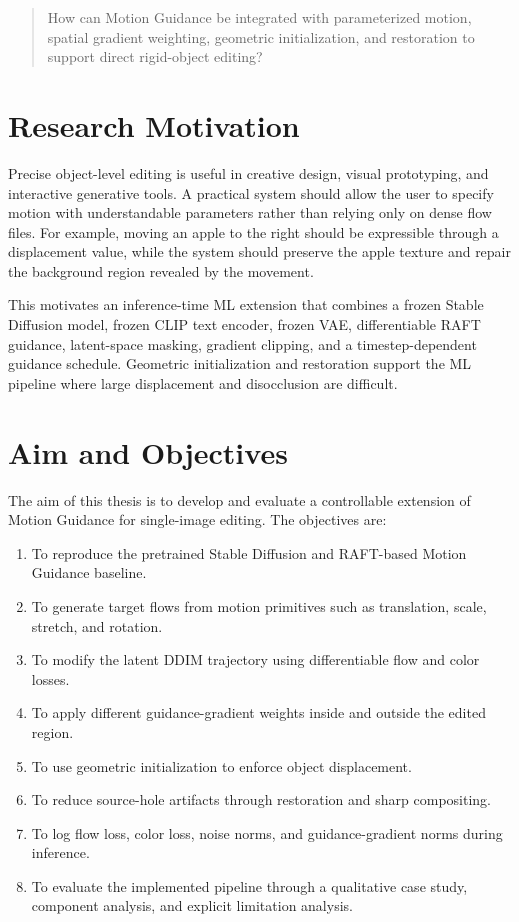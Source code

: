 \begin{quote}
How can Motion Guidance be integrated with parameterized motion, spatial gradient weighting, geometric initialization, and restoration to support direct rigid-object editing?
\end{quote}

\section{Research Motivation}

Precise object-level editing is useful in creative design, visual prototyping, and interactive generative tools. A practical system should allow the user to specify motion with understandable parameters rather than relying only on dense flow files. For example, moving an apple to the right should be expressible through a displacement value, while the system should preserve the apple texture and repair the background region revealed by the movement.

This motivates an inference-time ML extension that combines a frozen Stable Diffusion model, frozen CLIP text encoder, frozen VAE, differentiable RAFT guidance, latent-space masking, gradient clipping, and a timestep-dependent guidance schedule. Geometric initialization and restoration support the ML pipeline where large displacement and disocclusion are difficult.

\section{Aim and Objectives}

The aim of this thesis is to develop and evaluate a controllable extension of Motion Guidance for single-image editing. The objectives are:

\begin{enumerate}
  \item To reproduce the pretrained Stable Diffusion and RAFT-based Motion Guidance baseline.
  \item To generate target flows from motion primitives such as translation, scale, stretch, and rotation.
  \item To modify the latent DDIM trajectory using differentiable flow and color losses.
  \item To apply different guidance-gradient weights inside and outside the edited region.
  \item To use geometric initialization to enforce object displacement.
  \item To reduce source-hole artifacts through restoration and sharp compositing.
  \item To log flow loss, color loss, noise norms, and guidance-gradient norms during inference.
  \item To evaluate the implemented pipeline through a qualitative case study, component analysis, and explicit limitation analysis.
\end{enumerate}

